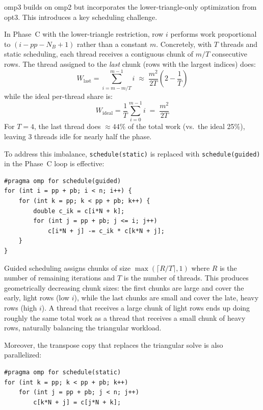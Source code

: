 \documentclass[10pt,leqno]{amsart}
\begin{document}
omp3 builds on omp2 but incorporates the lower-triangle-only optimization 
from opt3. This introduces a key scheduling challenge.

In Phase~C with the lower-triangle restriction, row $i$ performs work 
proportional to $(i - pp - N_B + 1)$ rather than a constant $m$. Concretely, 
with $T$ threads and static scheduling, each thread receives a contiguous 
chunk of $m/T$ consecutive rows. The thread assigned to the \emph{last} 
chunk (rows with the largest indices) does:
\begin{equation}
W_{\text{last}} = \sum_{i=m - m/T}^{m-1} i \;\approx\; \frac{m^2}{2T}\left(2 - \frac{1}{T}\right)
\end{equation}
while the ideal per-thread share is:
\begin{equation}
W_{\text{ideal}} = \frac{1}{T}\sum_{i=0}^{m-1} i \;=\; \frac{m^2}{2T}
\end{equation}
For $T = 4$, the last thread does $\approx 44\%$ of the total work (vs.\ the 
ideal 25\%), leaving 3 threads idle for nearly half the phase.

To address this imbalance, \texttt{schedule(static)} is replaced with 
\texttt{schedule(guided)} in the Phase~C loop is effective:

\begin{lstlisting}
#pragma omp for schedule(guided)
for (int i = pp + pb; i < n; i++) {
    for (int k = pp; k < pp + pb; k++) {
        double c_ik = c[i*N + k];
        for (int j = pp + pb; j <= i; j++)
            c[i*N + j] -= c_ik * c[k*N + j];
    }
}
\end{lstlisting}

Guided scheduling assigns chunks of size $\max(\lceil R/T \rceil, 1)$
where $R$ is the number of remaining iterations and $T$ is the number of
threads. This produces geometrically decreasing chunk sizes: the first
chunks are large and cover the early, light rows (low $i$), while the
last chunks are small and cover the late, heavy rows (high $i$). A thread
that receives a large chunk of light rows ends up doing roughly the same
total work as a thread that receives a small chunk of heavy rows, naturally
balancing the triangular workload.

Moreover, the transpose copy that replaces the triangular solve is also 
parallelized:

\begin{lstlisting}
#pragma omp for schedule(static)
for (int k = pp; k < pp + pb; k++)
    for (int j = pp + pb; j < n; j++)
        c[k*N + j] = c[j*N + k];
\end{lstlisting}
\end{document}
